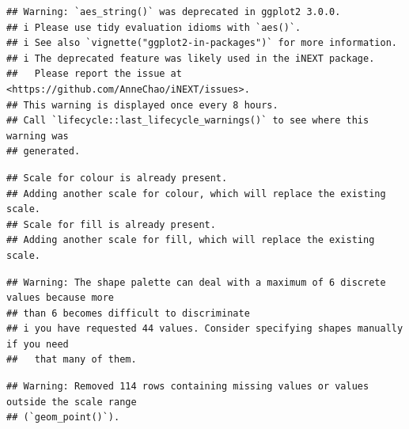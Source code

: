 \documentclass[
]{article}
\newenvironment{Shaded}{\begin{snugshade}}{\end{snugshade}}
\newcommand{\AttributeTok}[1]{\textcolor[rgb]{0.13,0.29,0.53}{#1}}
\newcommand{\DecValTok}[1]{\textcolor[rgb]{0.00,0.00,0.81}{#1}}
\newcommand{\FunctionTok}[1]{\textcolor[rgb]{0.13,0.29,0.53}{\textbf{#1}}}
\newcommand{\NormalTok}[1]{#1}
\newcommand{\SpecialCharTok}[1]{\textcolor[rgb]{0.81,0.36,0.00}{\textbf{#1}}}
\newcommand{\StringTok}[1]{\textcolor[rgb]{0.31,0.60,0.02}{#1}}
\begin{document}
\begin{Shaded}
\end{Shaded}

\begin{verbatim}
## Warning: `aes_string()` was deprecated in ggplot2 3.0.0.
## i Please use tidy evaluation idioms with `aes()`.
## i See also `vignette("ggplot2-in-packages")` for more information.
## i The deprecated feature was likely used in the iNEXT package.
##   Please report the issue at <https://github.com/AnneChao/iNEXT/issues>.
## This warning is displayed once every 8 hours.
## Call `lifecycle::last_lifecycle_warnings()` to see where this warning was
## generated.
\end{verbatim}

\begin{verbatim}
## Scale for colour is already present.
## Adding another scale for colour, which will replace the existing scale.
## Scale for fill is already present.
## Adding another scale for fill, which will replace the existing scale.
\end{verbatim}

\begin{verbatim}
## Warning: The shape palette can deal with a maximum of 6 discrete values because more
## than 6 becomes difficult to discriminate
## i you have requested 44 values. Consider specifying shapes manually if you need
##   that many of them.
\end{verbatim}

\begin{verbatim}
## Warning: Removed 114 rows containing missing values or values outside the scale range
## (`geom_point()`).
\end{verbatim}
\end{document}
